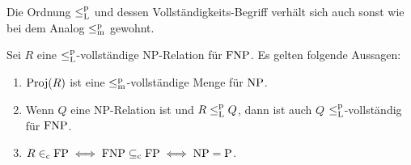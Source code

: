 Die Ordnung $\leq_\mathrm{L}^\mathrm{p}$ und dessen Vollständigkeits-Begriff verhält sich auch sonst wie bei dem Analog $\leq_\mathrm{m}^\mathrm{p}$ gewohnt.
\begin{lemma}\label{lemma:fnp-completeness}
    Sei $R$ eine $\leq_\mathrm{L}^\mathrm{p}$-vollständige NP-Relation für $\mathrm{FNP}$. Es gelten folgende Aussagen:
    \begin{enumerate}
        \item $\operatorname{Proj}(R)$ ist eine $\leq_\mathrm{m}^\mathrm{p}$-vollständige Menge für $\mathrm{NP}$.
        \item Wenn $Q$ eine NP-Relation ist und $R\leq_\mathrm{L}^\mathrm{p} Q$, dann ist auch $Q$ $\leq_\mathrm{L}^\mathrm{p}$-vollständig für $\mathrm{FNP}$.
        \item $R\in_\mathrm{c} \mathrm{FP} \iff \mathrm{FNP} \subseteq_\mathrm{c} \mathrm{FP} \iff \mathrm{NP}=\mathrm{P}$.
    \end{enumerate}
\end{lemma}

